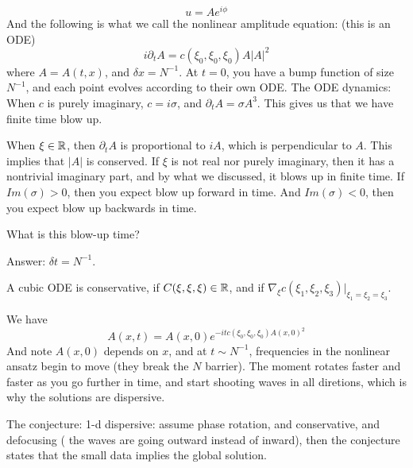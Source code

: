 \begin{equation*}
    u=Ae^{i\phi}
\end{equation*}
And the following is what we call the nonlinear amplitude equation: (this is an ODE)
\begin{equation*}
    i\partial_t A=c(\xi_0,\xi_0, \xi_0)A|A|^2
\end{equation*}
where $A=A(t,x)$, and $\delta x=N^{-1}$. At $t=0$, you have a bump function of size $N^{-1}$, and each point evolves according to their own ODE. The ODE dynamics: When $c$ is purely imaginary, $c=i\sigma$, and $\partial_tA=\sigma A^3$. This gives us that we have finite time blow up.

When $\xi\in\mathbb{R}$, then $\partial_tA$  is proportional to $iA$, which is perpendicular to $A$. This implies that $|A|$ is conserved. If $\xi$ is not real nor purely imaginary, then it has a nontrivial imaginary part, and by what we discussed, it blows up in finite time. If $Im(\sigma)>0$, then you expect blow up forward in time. And $Im(\sigma)<0$, then you expect blow up backwards in time.
\begin{problem}
    What is this blow-up time?
\end{problem}
Answer: $\delta t=N^{-1}$.

\begin{definition}
    A cubic ODE is conservative, if $C(\xi,\xi,\xi)\in\mathbb{R}$, and if $\nabla_\xi c(\xi_1,\xi_2,\xi_3)\vert_{\xi_1=\xi_2=\xi_3}$.
\end{definition}
We have 
\begin{equation*}
    A(x,t)=A(x,0)e^{-itc(\xi_0,\xi_0,\xi_0)A(x,0)^2}
\end{equation*}
And note $A(x,0)$ depends on $x$, and at $t\sim N^{-1}$, frequencies in the nonlinear ansatz begin to move (they break the $N$ barrier). The moment rotates faster and faster as you go further in time, and start shooting waves in all diretions, which is why the solutions are dispersive.

The conjecture:
1-d dispersive: assume phase rotation, and conservative, and defocusing ( the waves are going outward instead of inward), then the conjecture states that the small data implies the global solution.

